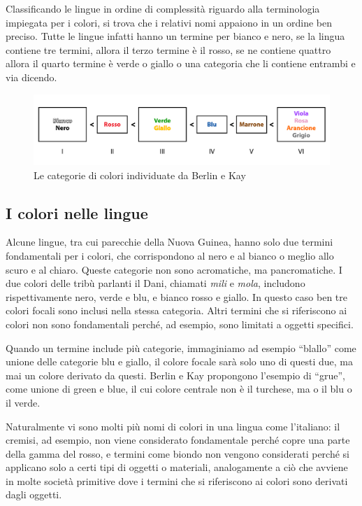 Classificando le lingue in ordine di complessità riguardo alla terminologia impiegata per i colori, si trova che i relativi nomi appaiono in un ordine ben preciso. Tutte le lingue infatti hanno un termine per bianco e nero, se la lingua contiene tre termini, allora il terzo termine è il rosso, se ne contiene quattro allora il quarto termine è verde o giallo o una categoria che li contiene entrambi e via dicendo.

\begin{figure}[hbt]
  \centering
  \includegraphics[width=\textwidth]{img/color-category}
  \caption{Le categorie di colori individuate da Berlin e Kay}
  \label{fig:categorie-colori}
\end{figure}

\subsection{I colori nelle lingue}
Alcune lingue, tra cui parecchie della Nuova Guinea, hanno solo due termini fondamentali per i colori, che corrispondono al nero e al bianco o meglio allo scuro e al chiaro. Queste categorie non sono acromatiche, ma pancromatiche. I due colori delle tribù parlanti il Dani, chiamati \emph{mili} e \emph{mola}, includono rispettivamente nero, verde e blu, e bianco rosso e giallo. In questo caso ben tre colori focali sono inclusi nella stessa categoria. Altri termini che si riferiscono ai colori non sono fondamentali perché, ad esempio, sono limitati a oggetti specifici.

Quando un termine include più categorie, immaginiamo ad esempio ``blallo'' come unione delle categorie blu e giallo, il colore focale sarà solo uno di questi due, ma mai un colore derivato da questi. Berlin e Kay propongono l’esempio di ``grue'', come unione di green e blue, il cui colore centrale non è il turchese, ma o il blu o il verde.

Naturalmente vi sono molti più nomi di colori in una lingua come l’italiano: il cremisi, ad esempio, non viene considerato fondamentale perché copre una parte della gamma del rosso, e termini come biondo non vengono considerati perché si applicano solo a certi tipi di oggetti o materiali, analogamente a ciò che avviene in molte società primitive dove i termini che si riferiscono ai colori sono derivati dagli oggetti.

